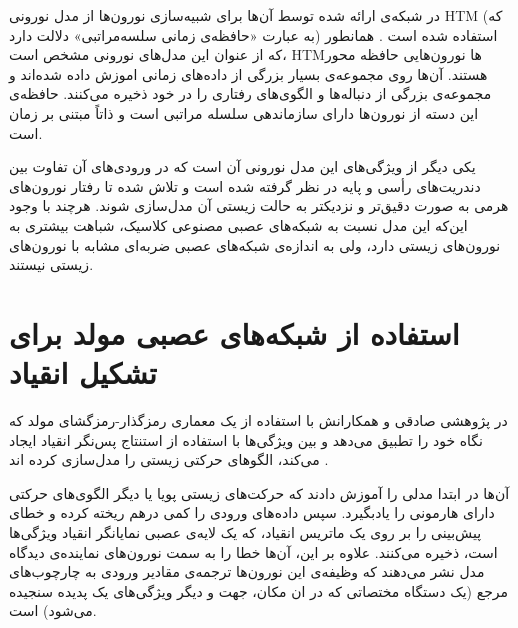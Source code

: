 \documentclass[12pt]{report}
\begin{document}
در شبکه‌ی ارائه شده توسط آن‌ها برای شبیه‌سازی نورون‌ها از مدل نورونی HTM (که به عبارت «حافظه‌ی زمانی سلسه‌مراتبی» دلالت دارد) استفاده شده است \cite{HTM2011}. همانطور که از عنوان این مدل‌های نورونی مشخص است، HTMها نورون‌هایی حافظه محور هستند. آن‌ها روی مجموعه‌ی بسیار بزرگی از داده‌های زمانی اموزش داده شده‌اند و مجموعه‌ی بزرگی از دنباله‌ها و الگوی‌های رفتاری را در خود ذخیره می‌کنند. حافظه‌ی این دسته از نورون‌ها دارای سازماندهی سلسله مراتبی است و ذاتاً مبتنی بر زمان است.

یکی دیگر از ویژگی‌های این مدل نورونی آن است که در ورودی‌های آن تفاوت بین دندریت‌های رأسی و پایه در نظر گرفته شده است و تلاش شده تا رفتار نورون‌های هرمی به صورت دقیق‌تر و نزدیکتر به حالت زیستی آن مدل‌سازی شوند. هرچند با وجود این‌که این مدل نسبت به شبکه‌های عصبی مصنوعی کلاسیک، شباهت بیشتری به نورون‌های زیستی دارد، ولی به اندازه‌ی شبکه‌های عصبی ضربه‌ای مشابه با نورون‌های زیستی نیستند.

\section{استفاده از شبکه‌های عصبی مولد برای تشکیل انقیاد}
در پژوهشی صادقی و همکارانش با استفاده از یک معماری رمزگذار-رمزگشای مولد که نگاه خود را تطبیق می‌دهد و بین ویژگی‌ها با استفاده از استنتاج پس‌نگر انقیاد ایجاد می‌کند، الگو‌های حرکتی زیستی را مدل‌سازی کرده اند \cite{Sadeghi2021}.

آن‌ها در ابتدا مدلی را آموزش دادند که حرکت‌های زیستی پویا یا دیگر الگوی‌های حرکتی دارای هارمونی را یادبگیرد. سپس داده‌های ورودی را کمی درهم ریخته‌ کرده و خطای پیش‌بینی را بر روی یک ماتریس انقیاد، که یک لایه‌ی عصبی نمایانگر انقیاد ویژگی‌ها است، ذخیره می‌کنند. علاوه‌ بر این، آن‌ها خطا را به سمت نورون‌های نماینده‌ی دیدگاه مدل نشر می‌دهند که وظیفه‌ی این نورون‌ها ترجمه‌ی مقادیر ورودی به چارچوب‌های مرجع (یک دستگاه مختصاتی که در ان مکان، جهت و دیگر ویژگی‌های یک پدیده سنجیده می‌شود) است.
\end{document}
